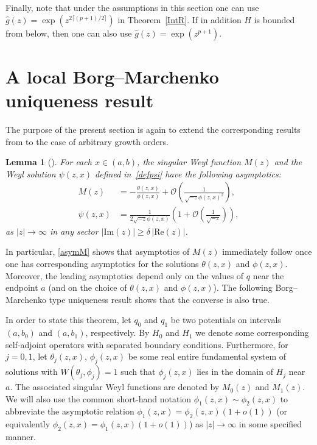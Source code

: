 \documentclass{amsart}
\newtheorem{lemma}[theorem]{Lemma}
\numberwithin{equation}{section}
\begin{document}
Finally, note that under the assumptions in this section one can use $\hat{g}(z)=\exp(z^{2{\lceil{(p+1)/2} \rceil}})$ in Theorem~\ref{IntR}.
If in addition $H$ is bounded from below, then one can also use $\hat{g}(z)=\exp(z^{p+1})$.

\section{A local Borg--Marchenko uniqueness result}
\label{sec:lbmt}

The purpose of the present section is again to extend the corresponding results from \cite[Section~7]{kst2} to the case of arbitrary
growth orders.

\begin{lemma}[\cite{kst2}]\label{lemAsymM}
For each $x\in(a,b)$, the singular Weyl function $M(z)$ and the Weyl solution $\psi(z,x)$ defined in~\eqref{defpsi}
have the following asymptotics:
\begin{align}\label{asymM}
M(z) &= -\frac{\theta(z,x)}{\phi(z,x)} + {\mathcal{O}}\left(\frac{1}{\sqrt{-z}\phi(z,x)^2}\right),\\ \label{asympsi}
\psi(z,x) &= \frac{1}{2\sqrt{-z} \phi(z,x)} \left( 1 + {\mathcal{O}}\left(\frac{1}{\sqrt{-z}}\right) \right),
\end{align}
as $|z|\to\infty$ in any sector $|{\mathrm{Im}}(z)| \geq \delta\, |{\mathrm{Re}}(z)|$.
\end{lemma}

In particular, \eqref{asymM} shows that asymptotics of $M(z)$ immediately follow once one
has corresponding asymptotics for the solutions $\theta(z,x)$ and $\phi(z,x)$. Moreover, the leading
asymptotics depend only on the values of $q$ near the endpoint $a$ (and on the choice of $\theta(z,x)$ and $\phi(z,x)$). 
The following Borg--Marchenko type uniqueness result shows that the converse is also true.

In order to state this theorem, let $q_0$ and $q_1$ be two potentials on intervals $(a,b_0)$ and $(a,b_1)$, respectively.
By $H_0$ and $H_1$ we denote some corresponding self-adjoint operators with separated boundary conditions.
Furthermore, for $j=0,1$, let $\theta_j(z,x)$, $\phi_j(z,x)$ be some real entire fundamental system of solutions with
$W(\theta_j,\phi_j)=1$ such that $\phi_j(z,x)$ lies in the domain of $H_j$ near $a$. 
The associated singular Weyl functions are denoted by $M_0(z)$ and $M_1(z)$. We will also use
the common short-hand notation $\phi_1(z,x) \sim \phi_2(z,x)$ to abbreviate the asymptotic relation
$\phi_1(z,x) = \phi_2(z,x) (1 + {o}(1))$ (or equivalently $\phi_2(z,x) = \phi_1(z,x) (1 + {o}(1))$) as $|z|\to\infty$
in some specified manner.
\end{document}
